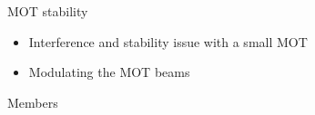 \documentclass{beamer}
\begin{document}


\begin{frame}{MOT stability}
  \begin{itemize}[<+->]
  \item Interference and stability issue with a small MOT
  \item Modulating the MOT beams
  \end{itemize}
\end{frame}

\begin{frame}{Members}
\end{frame}
\end{document}
